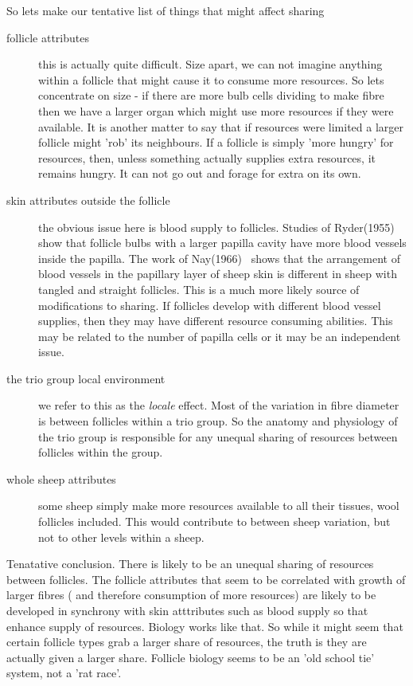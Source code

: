 \documentclass[titlepage]{article}  %
\begin{document}
So lets make our tentative list of things that might affect sharing
\begin{description}
\item[follicle attributes] this is actually quite difficult. Size apart, we can not imagine anything within a follicle that might cause it to consume more resources.  So lets concentrate on size - if there are more bulb cells dividing to make fibre then we have a larger organ which might use more resources if they were available.  It is another matter to say that if resources were limited a larger follicle might 'rob' its neighbours.  If a follicle is simply 'more hungry' for resources, then, unless something actually supplies extra resources, it remains hungry. It can not go out and forage for extra on its own.
\item[skin attributes outside the follicle] the obvious issue here is blood supply to follicles. Studies of Ryder(1955)~\cite{ryde:55} show that follicle bulbs with a larger papilla cavity have more blood vessels inside the papilla. The work of Nay(1966)~\cite{nay:66} shows that the arrangement of blood vessels in the papillary layer of sheep skin is different in sheep with tangled and straight follicles. This is a much more likely source of modifications to sharing. If follicles develop with different blood vessel supplies, then they may have different resource consuming abilities. This may be related to the number of papilla cells or it may be an independent issue.
\item[the trio group local environment] we refer to this as the {\em locale} effect. Most of the variation in fibre diameter is between follicles within a trio group. So the anatomy and physiology of the trio group is responsible for any unequal sharing of resources between follicles within the group.  
\item[whole sheep attributes]  some sheep simply make more resources available to all their tissues, wool follicles included. This would contribute to between sheep variation, but not to other levels within a sheep.
\end{description}

Tenatative conclusion. There is  likely to be an unequal sharing of resources between follicles. The follicle attributes that seem to be correlated with growth of larger fibres ( and therefore consumption of more resources) are likely to be developed in synchrony with skin atttributes such as blood supply so that enhance supply of resources. Biology works like that. So while it might seem that certain follicle types grab a larger share of resources, the truth is they are actually given a larger share. Follicle biology seems to be an 'old school tie' system, not a 'rat race'. 
\end{document}

